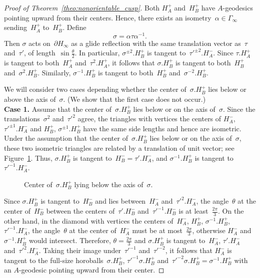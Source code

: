 \documentclass[11pt,reqno]{amsart}
\theoremstyle{definition}
\numberwithin{equation}{section}
\numberwithin{equation}{section}
\begin{document}
\begin{proof}[Proof of Theorem~\ref{theo:nonorientable_cusp}]
Both $H_A^+$ and~$H_B^+$ have $A$-geodesics pointing upward from their centers.
Hence, there exists an isometry~$\alpha \in \Gamma_\infty$ sending~$H_A^+$ to~$H_B^+$.
Define
\[
\sigma = \alpha \tau \alpha^{-1}.
\]
Then $\sigma$ acts on~$\partial H_\infty$ as a glide reflection with the same translation vector as~$\tau$ and~$\tau'$, of length~$\sin \frac{\theta}{2}$.
In particular, $\sigma^{\pm 2}.H_B^+$ is tangent to~$\tau'^{\pm 2}.H_A^-$.
Since $\tau.H_A^+$ is tangent to both~$H_A^+$ and~$\tau^2.H_A^+$, it follows that $\sigma.H_B^+$ is tangent to both~$H_B^+$ and~$\sigma^2.H_B^+$.
Similarly, $\sigma^{-1}.H_B^+$ is tangent to both~$H_B^+$ and~$\sigma^{-2}.H_B^+$.

\medskip

We will consider two cases depending whether the center of~$\sigma.H_B^+$ lies below or above the axis of~$\sigma$.
 (We show that the first case does not occur.) \\


\noindent \textbf{Case 1.} Assume that the center of~$\sigma.H_B^+$ lies below or on the axis of~$\sigma$.
Since the translations~$\sigma^2$ and~$\tau'^2$ agree, the triangles with vertices the centers of $H_A^-$, $\tau'^{\pm 1}.H_A^-$ and $H_B^+$, $\sigma^{\pm 1}. H_B^+$ have the same side lengths and hence are isometric.
Under the assumption that the center of~$\sigma.H_B^+$ lies below or on the axis of~$\sigma$, these two isometric triangles are related by a translation of unit vector; see Figure~\ref{fig:555}.
Thus, $\sigma.H_B^+$ is tangent to~$H_B^-=\tau'.H_A^-$, and $\sigma^{-1}.H_B^+$ is tangent to~$\tau'^{-1}.H_A^-$.


\medskip

\begin{figure}[htbp!]
\centering
\vspace*{3,7cm}
\hspace*{-0.5cm}
\def\svgwidth{0.3\textheight}

\vspace*{0.1cm}
\caption{Center of~$\sigma.H_B^+$ lying below the axis of~$\sigma$.} \label{fig:555}
\end{figure}


Since $\sigma.H_B^+$ is tangent to~$H_B^-$ and lies between~$H_A^-$ and~$\tau'^2.H_A^-$, the angle~$\theta$ at the center of~$H_B^-$ between the centers of~$\tau'.H_B^-$ and~$\tau'^{-1}.H_B^-$ is at least~$\frac{2\pi}{3}$.
On the other hand, in the diamond with vertices the centers of~$H_A^-$, $H_B^+$, $\sigma^{-1}.H_B^+$, $\tau'^{-1}.H_A^-$, the angle~$\theta$ at the center of~$H_A^-$ must be at most~$\frac{2\pi}{3}$, otherwise $H_A^-$ and~$\sigma^{-1}.H_B^+$ would intersect.
Therefore, $\theta=\frac{2\pi}{3}$ and $\sigma.H_B^+$ is tangent to~$H_A^-$, $\tau'.H_A^-$ and~$\tau'^2.H_A^-$.
Taking their image under~$\tau'^{-1}$ and~$\tau'^{-2}$, it follows that $H_A^-$ is tangent to the full-size horoballs~$\sigma.H_B^+$, $\tau'^{-1} \sigma.H_B^+$ and~$\tau'^{-2} \sigma.H_B^+ = \sigma^{-1}.H_B^+$ with an $A$-geodesic pointing upward from their center.


\end{proof}
\end{document}
